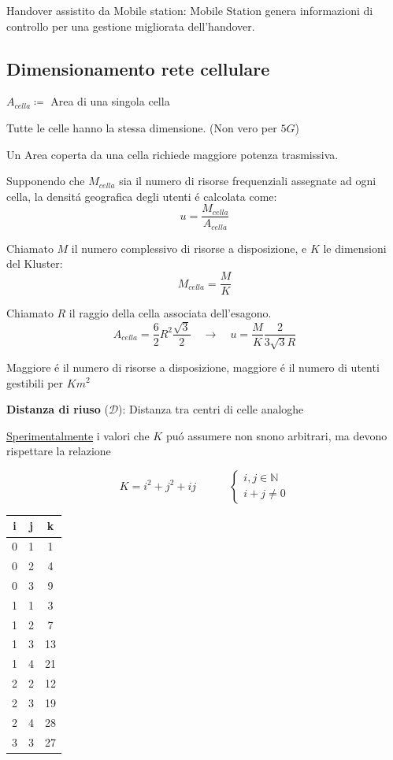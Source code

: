 \documentclass{article}
\begin{document}
Handover assistito da Mobile station: Mobile Station genera informazioni di controllo per una gestione migliorata dell'handover.

\subsection{Dimensionamento rete cellulare}

$A_{cella} \coloneqq$ Area di una singola cella

Tutte le celle hanno la stessa dimensione. (Non vero per $5G$)

Un Area coperta da una cella richiede maggiore potenza trasmissiva.

Supponendo che $M_{cella}$ sia il numero di risorse frequenziali assegnate ad ogni cella, la densit\'a geografica degli utenti \'e calcolata come:
\[ u = \frac{M_{cella}}{A_{cella}} \]

Chiamato $M$ il numero complessivo di risorse a disposizione, e $K$ le dimensioni del Kluster:
\[ M_{cella} = \frac{M}{K} \]

Chiamato $R$ il raggio della cella associata dell'esagono.
\[ A_{cella} = \frac{6}{2}R^2\frac{\sqrt{3}}{2} \quad \rightarrow \quad
    u=\frac{M}{K}\frac{2}{3\sqrt{3}R}
\]

Maggiore \'e il numero di risorse a disposizione, maggiore \'e il numero di utenti gestibili per $Km^2$

\textbf{Distanza di riuso} ($\mathcal{D}$): Distanza tra centri di celle analoghe

\underline{Sperimentalmente} i valori che $K$ pu\'o assumere non snono arbitrari, ma devono rispettare la relazione
\begin{minipage}{0.5\textwidth}
\[ K = i^2 + j^2 + ij \qquad\quad
    \begin{cases}
    i,j \in \mathbb{N} \\
    i+j \neq 0
    \end{cases}
\]
\end{minipage}
\begin{minipage}{0.3\textwidth}

\begin{center}
\begin{tabular}{c c|c}
    i & j & k\\
    \hline{}
    0 & 1 & 1\\
    0 & 2 & 4\\
    0 & 3 & 9\\
    1 & 1 & 3\\
    1 & 2 & 7\\
    1 & 3 & 13\\
    1 & 4 & 21\\
    2 & 2 & 12\\
    2 & 3 & 19\\
    2 & 4 & 28\\
    3 & 3 & 27\\
\end{tabular}
\end{center}
\end{minipage}
\end{document}
